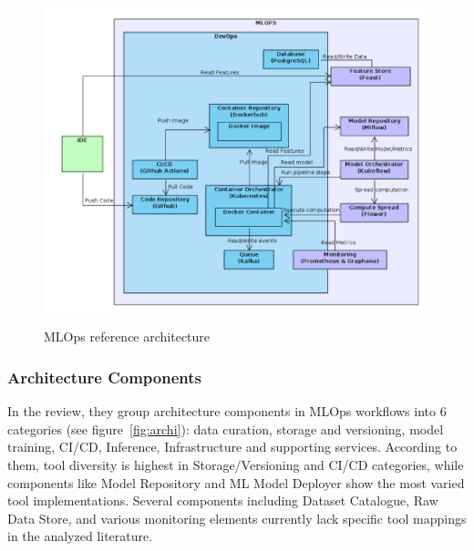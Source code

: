 \begin{figure}[!htbp]
    \caption{MLOps reference architecture\cite{10855428}}
    \centering
    \includegraphics[scale=0.35]{images/infrastructure}
    \label{fig:infra}
\end{figure}

\subsubsection{Architecture Components}
In the review\cite{Amou_Najafabadi_2024}, they group architecture components in MLOps workflows into 6 categories (see figure~\ref{fig:archi}):
data curation, storage and versioning, model training, CI/CD, Inference, Infrastructure and supporting services.
According to them\cite{Amou_Najafabadi_2024}, tool diversity is highest in Storage/Versioning and CI/CD categories, while components like Model Repository and ML Model Deployer show the most varied tool implementations.
Several components including Dataset Catalogue, Raw Data Store, and various monitoring elements currently lack specific tool mappings in the analyzed literature.

